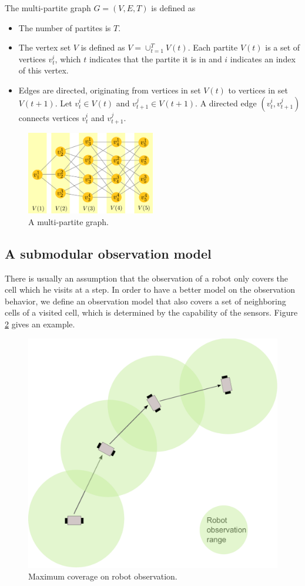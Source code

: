 \documentclass[12pt]{article}
\begin{document}
\begin{mydef}
\label{def:multi_partite}
The multi-partite graph $ G = (V, E, T) $ is defined as
\begin{itemize}
\item The number of partites is $ T $.
\item The vertex set $ V $ is defined as $ V = \cup_{t=1}^{T} V(t) $.
Each partite $ V(t) $ is a set of vertices $ v^{i}_{t} $, which $ t $ indicates that the partite it is in and $ i $ indicates an index of this vertex.
\item Edges are directed, originating from vertices in set $ V(t) $ to vertices in set $ V(t+1) $. Let $ v^{i}_{t} \in V(t) $ and $ v^{j}_{t+1} \in V(t+1) $.
A directed edge $ (v^{i}_{t}, v^{j}_{t+1}) $ connects vertices $ v^{i}_{t} $ and $ v^{j}_{t+1} $. 
\end{itemize}
\end{mydef}

\begin{figure}[htbp]
\centering
\includegraphics[width=0.5\textwidth]{./MultiPartite}
\caption{A multi-partite graph.}
\label{fig:MultiPartite}
\end{figure}

\subsection{A submodular observation model}

There is usually an assumption that the observation of a robot only covers the cell which he visits at a step.
In order to have a better model on the observation behavior, we define an observation model that also covers a set of neighboring cells of a visited cell, which is determined by the capability of the sensors. Figure \ref{fig:robotObservation} gives an example.

\begin{figure}
\centering
\includegraphics[width=0.5\linewidth]{./robotObservation}
\caption{Maximum coverage on robot observation.}
\label{fig:robotObservation}
\end{figure}
\end{document}

